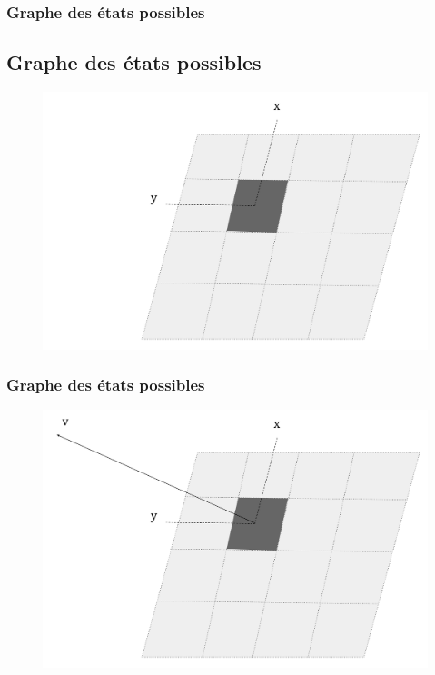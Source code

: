 \documentclass[c]{beamer}
\begin{document}
\begin{frame}[label=structures1]
\transdissolve[duration=1]
\frametitle{Graphe des états possibles}
\subsection{Graphe des états possibles}
\begin{figure}[!h]
\centering
\includegraphics[scale=0.3]{fig/g001.pdf}
\end{figure}
\end{frame}

\begin{frame}[label=structures2]
\transdissolve[duration=1]
\frametitle{Graphe des états possibles}
\begin{figure}[!h]
\centering
\includegraphics[scale=0.3]{fig/g002.pdf}
\end{figure}
\end{frame}
\end{document}
